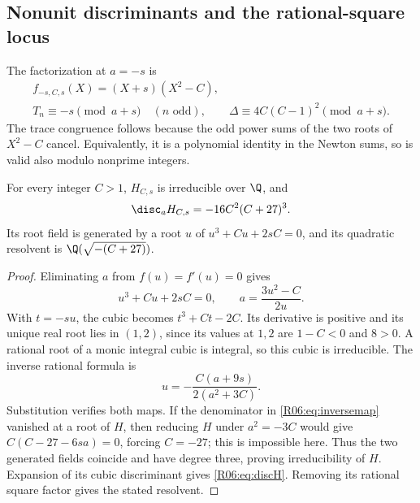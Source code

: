 \documentclass[11pt,a4paper]{article}
\theoremstyle{definition}\newtheorem{definition}[theorem]{Definition}
\theoremstyle{remark}\newtheorem{remark}[theorem]{Remark}
\begin{document}
\subsection{Nonunit discriminants and the rational-square locus}
\label{R06:sec:geometry}

The factorization at $a=-s$ is
\begin{equation}\label{R06:eq:unitcongruences}
 \begin{gathered}
 f_{-s,C,s}(X)=(X+s)(X^2-C),\\
 T_n\equiv-s\pmod{a+s}\quad(n\text{ odd}),\qquad
 \Delta\equiv4C(C-1)^2\pmod{a+s}.
 \end{gathered}
\end{equation}
The trace congruence follows because the odd power sums of the two
roots of $X^2-C$ cancel. Equivalently, it is a polynomial identity
in the Newton sums, so is valid also modulo nonprime integers.

\begin{proposition}\label{R06:prop:irredH}
For every integer $C>1$, $H_{C,s}$ is irreducible over $\Q$, and
\begin{equation}\label{R06:eq:discH}
 \disc_a H_{C,s}=-16C^2(C+27)^3.
\end{equation}
Its root field is generated by a root $u$ of
$u^3+Cu+2sC=0$, and its quadratic resolvent is
$\Q(\sqrt{-(C+27)})$.
\end{proposition}
\begin{proof}
Eliminating $a$ from $f(u)=f'(u)=0$ gives
\begin{equation}\label{R06:eq:rootmap}
 u^3+Cu+2sC=0,\qquad a=\frac{3u^2-C}{2u}.
\end{equation}
With $t=-su$, the cubic becomes $t^3+Ct-2C$.
Its derivative is positive and its unique real root lies in $(1,2)$,
since its values at $1,2$ are $1-C<0$ and $8>0$.
A rational root of a monic integral cubic is integral, so this cubic
is irreducible. The inverse rational formula is
\begin{equation}\label{R06:eq:inversemap}
 u=-\frac{C(a+9s)}{2(a^2+3C)}.
\end{equation}
Substitution verifies both maps. If the denominator in
\eqref{R06:eq:inversemap} vanished at a root of $H$, then reducing $H$
under $a^2=-3C$ would give $C(C-27-6sa)=0$, forcing $C=-27$;
this is impossible here. Thus the two generated fields coincide
and have degree three, proving irreducibility of $H$.
Expansion of its cubic discriminant gives \eqref{R06:eq:discH}.
Removing its rational square factor gives the stated resolvent.
\end{proof}
\end{document}
